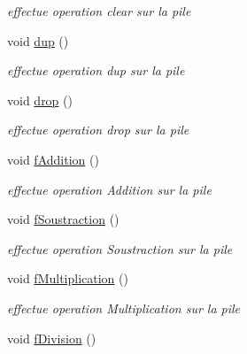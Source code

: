 \begin{DoxyCompactItemize}
\begin{DoxyCompactList}\small\item\em effectue operation clear sur la pile \end{DoxyCompactList}\item 
\hypertarget{class_pile_a081f7843d01cae1f0f7be7d92e46d5d2}{void \hyperlink{class_pile_a081f7843d01cae1f0f7be7d92e46d5d2}{dup} ()}\label{class_pile_a081f7843d01cae1f0f7be7d92e46d5d2}

\begin{DoxyCompactList}\small\item\em effectue operation dup sur la pile \end{DoxyCompactList}\item 
\hypertarget{class_pile_a7488ed257c6ceb16ed57a9fffb0726d5}{void \hyperlink{class_pile_a7488ed257c6ceb16ed57a9fffb0726d5}{drop} ()}\label{class_pile_a7488ed257c6ceb16ed57a9fffb0726d5}

\begin{DoxyCompactList}\small\item\em effectue operation drop sur la pile \end{DoxyCompactList}\item 
\hypertarget{class_pile_a94a0b5e00d490a838cdbd4b2cd141e76}{void \hyperlink{class_pile_a94a0b5e00d490a838cdbd4b2cd141e76}{f\-Addition} ()}\label{class_pile_a94a0b5e00d490a838cdbd4b2cd141e76}

\begin{DoxyCompactList}\small\item\em effectue operation Addition sur la pile \end{DoxyCompactList}\item 
\hypertarget{class_pile_ad296bc1695546ffa4a412143c16c9b28}{void \hyperlink{class_pile_ad296bc1695546ffa4a412143c16c9b28}{f\-Soustraction} ()}\label{class_pile_ad296bc1695546ffa4a412143c16c9b28}

\begin{DoxyCompactList}\small\item\em effectue operation Soustraction sur la pile \end{DoxyCompactList}\item 
\hypertarget{class_pile_ab3c86545524e1d4f1967bee9f98f7073}{void \hyperlink{class_pile_ab3c86545524e1d4f1967bee9f98f7073}{f\-Multiplication} ()}\label{class_pile_ab3c86545524e1d4f1967bee9f98f7073}

\begin{DoxyCompactList}\small\item\em effectue operation Multiplication sur la pile \end{DoxyCompactList}\item 
\hypertarget{class_pile_ac07c42f15aff4fd36d939478f4a8ba74}{void \hyperlink{class_pile_ac07c42f15aff4fd36d939478f4a8ba74}{f\-Division} ()}\label{class_pile_ac07c42f15aff4fd36d939478f4a8ba74}


\end{DoxyCompactItemize}
